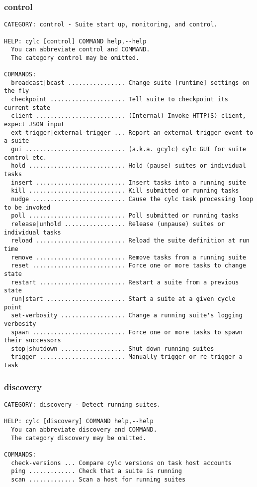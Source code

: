 \subsubsection{control}
\label{control}
\begin{lstlisting}
CATEGORY: control - Suite start up, monitoring, and control.

HELP: cylc [control] COMMAND help,--help
  You can abbreviate control and COMMAND.
  The category control may be omitted.

COMMANDS:
  broadcast|bcast ................ Change suite [runtime] settings on the fly
  checkpoint ..................... Tell suite to checkpoint its current state
  client ......................... (Internal) Invoke HTTP(S) client, expect JSON input
  ext-trigger|external-trigger ... Report an external trigger event to a suite
  gui ............................ (a.k.a. gcylc) cylc GUI for suite control etc.
  hold ........................... Hold (pause) suites or individual tasks
  insert ......................... Insert tasks into a running suite
  kill ........................... Kill submitted or running tasks
  nudge .......................... Cause the cylc task processing loop to be invoked
  poll ........................... Poll submitted or running tasks
  release|unhold ................. Release (unpause) suites or individual tasks
  reload ......................... Reload the suite definition at run time
  remove ......................... Remove tasks from a running suite
  reset .......................... Force one or more tasks to change state
  restart ........................ Restart a suite from a previous state
  run|start ...................... Start a suite at a given cycle point
  set-verbosity .................. Change a running suite's logging verbosity
  spawn .......................... Force one or more tasks to spawn their successors
  stop|shutdown .................. Shut down running suites
  trigger ........................ Manually trigger or re-trigger a task
\end{lstlisting}
\subsubsection{discovery}
\label{discovery}
\begin{lstlisting}
CATEGORY: discovery - Detect running suites.

HELP: cylc [discovery] COMMAND help,--help
  You can abbreviate discovery and COMMAND.
  The category discovery may be omitted.

COMMANDS:
  check-versions ... Compare cylc versions on task host accounts
  ping ............. Check that a suite is running
  scan ............. Scan a host for running suites
\end{lstlisting}
